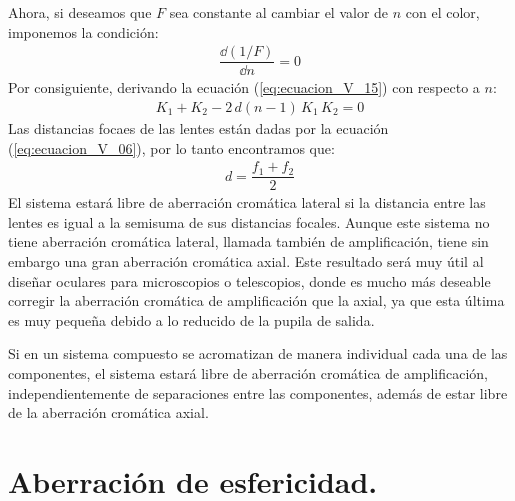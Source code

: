 \documentclass[14pt]{extarticle}
\begin{document}
Ahora, si deseamos que $F$ sea constante al cambiar el valor de $n$ con el color, imponemos la condición:
\begin{align}
\dfrac{\dd{(1/F)}}{\dd{n}} = 0
\label{eq:ecuacion_V_16}
\end{align}
Por consiguiente, derivando la ecuación (\ref{eq:ecuacion_V_15}) con respecto a $n$:
\begin{align}
K_{1} + K_{2} - 2 \, d (n - 1) \, K_{1} \, K_{2} = 0
\label{eq:ecuacion_V_17}
\end{align}
Las distancias focaes de las lentes están dadas por la ecuación (\ref{eq:ecuacion_V_06}), por lo tanto encontramos que:
\begin{align}
d = \dfrac{f_{1} + f_{2}}{2}
\label{eq:ecuacion_V_18}
\end{align}
El sistema estará libre de aberración cromática lateral si la distancia entre las lentes es igual a la semisuma de sus distancias focales. Aunque este sistema no tiene aberración cromática lateral, llamada también de amplificación, tiene sin embargo una gran aberración cromática axial. Este resultado será muy útil al diseñar oculares para microscopios o telescopios, donde es mucho más deseable corregir la aberración cromática de amplificación que la axial, ya que esta última es muy pequeña debido a lo reducido de la pupila de salida.

Si en un sistema compuesto se acromatizan de manera individual cada una de las componentes, el sistema estará libre de aberración cromática de amplificación, independientemente de separaciones entre las componentes, además de estar libre de la aberración cromática axial.

\section{Aberración de esfericidad.}
\end{document}
